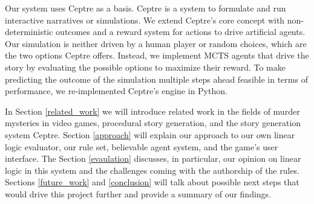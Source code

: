 Our system uses Ceptre \cite{martens_2015} as a basis. Ceptre is a system to formulate and run interactive narratives or simulations.
We extend Ceptre's core concept with non-deterministic outcomes and a reward system for actions to drive artificial agents.
Our simulation is neither driven by a human player or random choices, which are the two options Ceptre offers.
Instead, we implement MCTS agents that drive the story by evaluating the possible options to maximize their reward.
To make predicting the outcome of the simulation multiple steps ahead feasible in terms of performance, we re-implemented Ceptre's engine in Python.

In Section \ref{related_work} we will introduce related work in the fields of murder mysteries in video games, procedural story generation, and the story generation system Ceptre.
Section \ref{approach} will explain our approach to our own linear logic evaluator, our rule set, believable agent system, and the game's user interface.
The Section \ref{evaulation} discusses, in particular, our opinion on linear logic in this system and the challenges coming with the authorship of the rules.
Sections \ref{future_work} and \ref{conclusion} will talk about possible next steps that would drive this project further and provide a summary of our findings.
